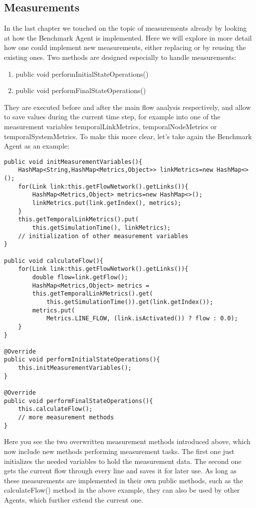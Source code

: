 \documentclass[11pt,fleqn]{book} %
\begin{document}
\subsection{Measurements}
In the last chapter we touched on the topic of measurements already by looking at how the Benchmark Agent is implemented. Here we will explore in more detail how one could implement new measurements, either replacing or by reusing the existing ones. 
Two methods are designed especially to handle measurements:
\begin{enumerate}
	\item public void performInitialStateOperations()
	\item public void performFinalStateOperations()
\end{enumerate}
They are executed before and after the main flow analysis respectively, and allow to save values during the current time step, for example into one of the measurement variables temporalLinkMetrics, temporalNodeMetrics or temporalSystemMetrics.
To make this more clear, let’s take again the Benchmark Agent as an example:
\begin{lstlisting}[frame=single]
public void initMeasurementVariables(){
    HashMap<String,HashMap<Metrics,Object>> linkMetrics=new HashMap<>();
    for(Link link:this.getFlowNetwork().getLinks()){
        HashMap<Metrics,Object> metrics=new HashMap<>();
        linkMetrics.put(link.getIndex(), metrics);
    }
    this.getTemporalLinkMetrics().put(
    	this.getSimulationTime(), linkMetrics);
    // initialization of other measurement variables
}        

public void calculateFlow(){
    for(Link link:this.getFlowNetwork().getLinks()){
        double flow=link.getFlow();
        HashMap<Metrics,Object> metrics = 
        this.getTemporalLinkMetrics().get(
        	this.getSimulationTime()).get(link.getIndex());
        metrics.put(
        	Metrics.LINE_FLOW, (link.isActivated()) ? flow : 0.0);
    }
}

@Override
public void performInitialStateOperations(){
    this.initMeasurementVariables();
}
    
@Override
public void performFinalStateOperations(){
    this.calculateFlow();
    // more measurement methods
}
\end{lstlisting}

Here you see the two overwritten measurement methods introduced above, which now include new methods performing measurement tasks. The first one just initializes the needed variables to hold the measurement data. The second one gets the current flow through every line and saves it for later use. As long as these measurements are implemented in their own public methods, such as the calculateFlow() method in the above example, they can also be used by other Agents, which further extend the current one.
\end{document}

